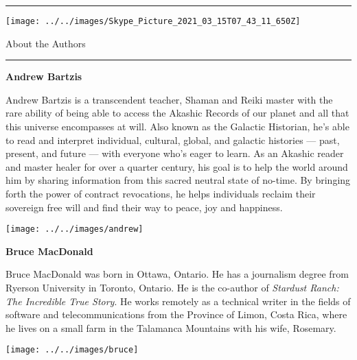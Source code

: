 \documentclass[letterpaper,10.5pt,twoside,onecolumn,openany]{book}
\begin{document}


\newpage

\thispagestyle{empty}

\hrule

\vspace{35mm}

\begin{center}
	\texttt{[image: ../../images/Skype\_Picture\_2021\_03\_15T07\_43\_11\_650Z]}
\end{center}

\newpage

\thispagestyle{empty}

\begin{center}
	
\huge{About the Authors}


	
\end{center}

\hrule

\vspace{5mm}

\noindent\textbf{{\large Andrew Bartzis}}

\vspace{5mm}

\singlespace
\small{
\noindent Andrew Bartzis is a transcendent teacher, Shaman and Reiki master with the rare ability of being able to access the Akashic Records of our planet and all that this universe encompasses at will. Also known as the Galactic Historian, he's able to read and interpret individual, cultural, global, and galactic histories --- past, present, and future --- with everyone who's eager to learn. As an Akashic reader and master healer for over a quarter century, his goal is to help the world around him by sharing information from this sacred neutral state of no-­time. By bringing forth the power of contract revocations, he helps individuals reclaim their sovereign free will and find their way to peace, joy and happiness.}
\begin{center}
\texttt{[image: ../../images/andrew]}
\end{center}



\vspace{5mm}

\noindent\textbf{{\large Bruce MacDonald}}

\vspace{5mm}

\singlespace
\small{
\noindent
Bruce MacDonald was born in Ottawa, Ontario. He has a journalism degree from Ryerson University in Toronto, Ontario. He is the co-author of \textit{Stardust Ranch: The Incredible True Story}. He works remotely as a technical writer in the fields of software and telecommunications from the Province of Limon, Costa Rica, where he lives on a small farm in the Talamanca Mountains with his wife, Rosemary.}


	
	
\begin{center}
	\texttt{[image: ../../images/bruce]}
\end{center}
\end{document}
